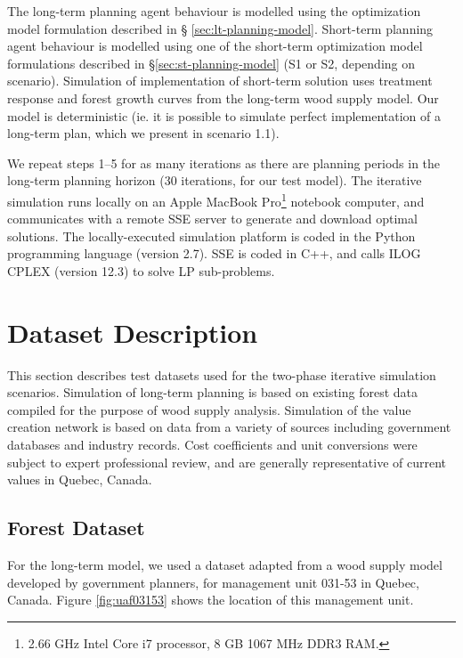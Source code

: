 The long-term planning agent behaviour is modelled using the
optimization model formulation described in \S
\ref{sec:lt-planning-model}. Short-term planning agent behaviour is
modelled using one of the short-term optimization model formulations
described in \S \ref{sec:st-planning-model} (S1 or S2, depending on
scenario). Simulation of implementation of short-term solution uses
treatment response and forest growth curves from the long-term wood
supply model. Our model is deterministic (ie. it is possible to
simulate perfect implementation of a long-term plan, which we present in
scenario 1.1).

We repeat steps 1--5 for as many iterations as there are planning
periods in the long-term planning horizon (30 iterations, for our test
model). The iterative simulation runs locally on an Apple MacBook
Pro\footnote{2.66 GHz Intel Core i7 processor, 8 GB 1067 MHz DDR3
  RAM.} notebook computer, and communicates with a remote SSE server to generate and
download optimal solutions. The locally-executed simulation platform is
coded in the Python programming language (version 2.7). SSE is coded
in C++, and calls ILOG CPLEX (version 12.3) to solve LP sub-problems.

\section{Dataset Description}
\label{sec:dataset}

This section describes test datasets used for the two-phase
iterative simulation scenarios. Simulation of long-term planning is
based on existing forest data compiled for the purpose of wood supply
analysis.  Simulation of the value creation network is based on data
from a variety of sources including government databases and industry
records. Cost coefficients and unit conversions were subject to expert
professional review, and are generally representative of current
values in Quebec, Canada.


\subsection{Forest Dataset}

For the long-term model, we used a dataset adapted from a wood supply
model developed by government planners, for management unit 031-53 in
Quebec, Canada. Figure \ref{fig:uaf03153} shows the location of this
management unit.

